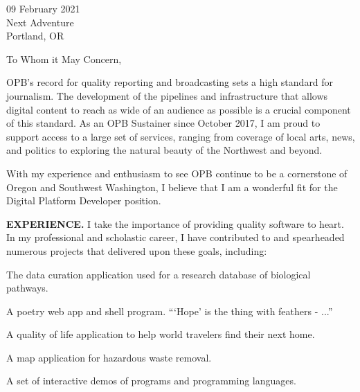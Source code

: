 



\textcolor{my-grey}{\dotfill}
\bigbreak


09 February 2021\\
Next Adventure\\
Portland, OR

\vspace*{2\baselineskip}

To Whom it May Concern,

\vspace*{2\baselineskip}

OPB's record for quality reporting and broadcasting sets a high standard for journalism. The development of the pipelines and infrastructure that allows digital content to reach as wide of an audience as possible is a crucial component of this standard. As an OPB Sustainer since October 2017, I am proud to support access to a large set of services, ranging from coverage of local arts, news, and politics to exploring the natural beauty of the Northwest and beyond.

\vspace*{\baselineskip}

With my experience and enthusiasm to see OPB continue to be a cornerstone of Oregon and Southwest Washington, I believe that I am a wonderful fit for the Digital Platform Developer position.

\vspace*{\baselineskip}

\textbf{EXPERIENCE.} I take the importance of providing quality software to heart. In my professional and scholastic career, I have contributed to and spearheaded numerous projects that delivered upon these goals, including:

\begin{itemize}[label=$\triangleright$]
The data curation application used for a research database of biological pathways.

A poetry web app and shell program. ```Hope' is the thing with feathers - ...''

A quality of life application to help world travelers find their next home.

A map application for hazardous waste removal.

A set of interactive demos of programs and programming languages.

\end{itemize}

